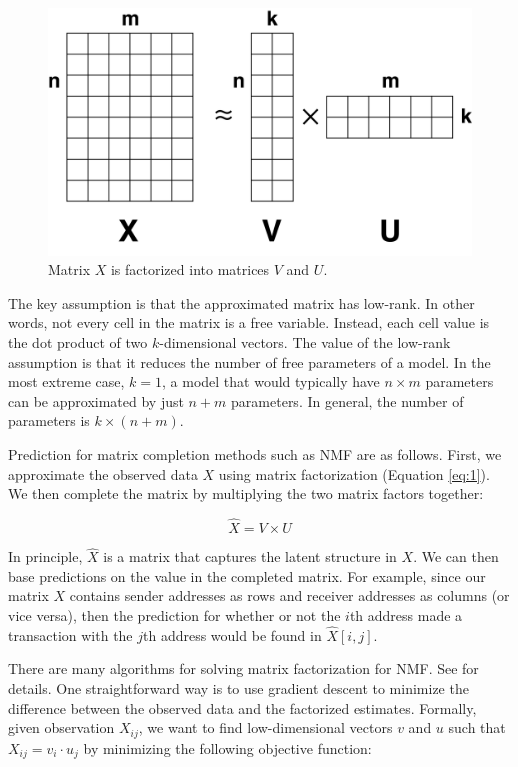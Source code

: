 \documentclass{article} %
\begin{document}
\begin{figure}[!htbp]
    \centering
    \includegraphics[scale=0.2]{figures/matrix_completion}
    \caption{\small Matrix $X$ is factorized into matrices $V$ and $U$.}
    \label{fig:matrix_completion}
\end{figure}

The key assumption is that the approximated matrix has low-rank. In other words, not every cell in the matrix is a free variable. Instead, each cell value is the dot product of two $k$-dimensional vectors. The value of the low-rank assumption is that it reduces the number of free parameters of a model. In the most extreme case, $k=1$, a model that would typically have $n \times m$ parameters can be approximated by just $n + m$ parameters. In general, the number of parameters is $k \times (n + m)$.

Prediction for matrix completion methods such as NMF are as follows. First, we approximate the observed data $X$ using matrix factorization (Equation \ref{eq:1}). We then complete the matrix by multiplying the two matrix factors together:

$$
\hat{X} = V \times U
$$

In principle, $\hat{X}$ is a matrix that captures the latent structure in $X$. We can then base predictions on the value in the completed matrix. For example, since our matrix $X$ contains sender addresses as rows and receiver addresses as columns (or vice versa), then the prediction for whether or not the $i$th address made a transaction with the $j$th address would be found in $\hat{X}[i, j]$.

There are many algorithms for solving matrix factorization for NMF. See \cite{lee2001algorithms} for details. One straightforward way is to use gradient descent to minimize the difference between the observed data and the factorized estimates. Formally, given observation $X_{ij}$, we want to find low-dimensional vectors $v$ and $u$ such that $X_{ij} = v_i \cdot  u_j$ by minimizing the following objective function:
\end{document}
